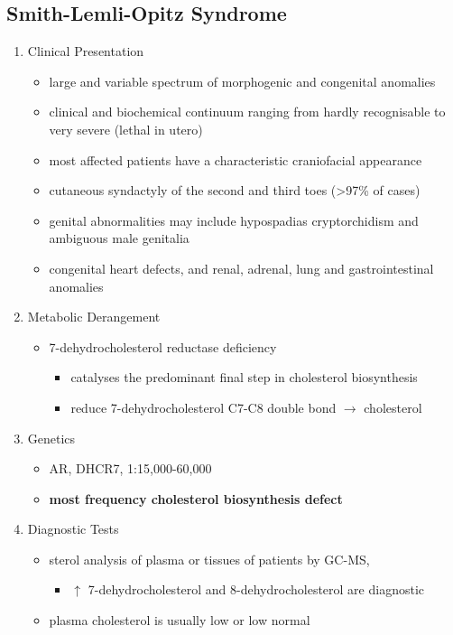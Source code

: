 \documentclass{scrartcl}
\begin{document}
\subsection{Smith-Lemli-Opitz Syndrome}
\label{sec:org05d6ee2}
\begin{enumerate}
\item Clinical Presentation
\label{sec:org6477aad}
\begin{itemize}
\item large and variable spectrum of morphogenic and congenital anomalies
\item clinical and biochemical continuum ranging from hardly recognisable
to very severe (lethal in utero)
\item most affected patients have a characteristic craniofacial appearance
\item cutaneous syndactyly of the second and third toes (>97\% of cases)
\item genital abnormalities may include hypospadias cryptorchidism and
ambiguous male genitalia
\item congenital heart defects, and renal, adrenal, lung and
gastrointestinal anomalies
\end{itemize}

\item Metabolic Derangement
\label{sec:org9c54c20}
\begin{itemize}
\item 7-dehydrocholesterol reductase deficiency
\begin{itemize}
\item catalyses the predominant final step in cholesterol biosynthesis
\item reduce 7-dehydrocholesterol C7-C8 double bond \(\to\) cholesterol
\end{itemize}
\end{itemize}

\item Genetics
\label{sec:org8bf785f}
\begin{itemize}
\item AR, DHCR7, 1:15,000-60,000
\item \textbf{most frequency cholesterol biosynthesis defect}
\end{itemize}

\item Diagnostic Tests
\label{sec:orgf10348a}
\begin{itemize}
\item sterol analysis of plasma or tissues of patients by GC-MS,
\begin{itemize}
\item \(\uparrow\) 7-dehydrocholesterol and 8-dehydrocholesterol are diagnostic
\end{itemize}
\item plasma cholesterol is usually low or low normal
\end{itemize}


\end{enumerate}
\end{document}
